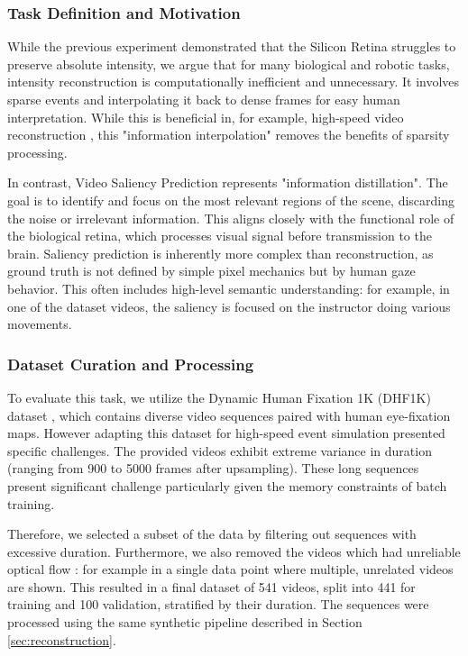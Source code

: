 \documentclass{article}
\begin{document}
\subsubsection{Task Definition and Motivation}
While the previous experiment demonstrated that the Silicon Retina struggles to preserve absolute intensity, we argue that for many biological and robotic tasks, intensity reconstruction is computationally inefficient and unnecessary. It involves sparse events and interpolating it back to dense frames for easy human interpretation. While this is beneficial in, for example, high-speed video reconstruction \cite{rebecq_high_2019}, this "information interpolation" removes the benefits of sparsity processing. 

In contrast, Video Saliency Prediction represents "information distillation". The goal is to identify and focus on the most relevant regions of the scene, discarding the noise or irrelevant information. This aligns closely with the functional role of the biological retina, which processes visual signal before transmission to the brain. Saliency prediction is inherently more complex than reconstruction, as ground truth is not defined by simple pixel mechanics but by human gaze behavior. This often includes high-level semantic understanding: for example, in one of the dataset videos, the saliency is focused on the instructor doing various movements. 

\subsubsection{Dataset Curation and Processing}
To evaluate this task, we utilize the Dynamic Human Fixation 1K (DHF1K) dataset \cite{wang_revisiting_2021}, which contains diverse video sequences paired with human eye-fixation maps. However adapting this dataset for high-speed event simulation presented specific challenges. The provided videos exhibit extreme variance in duration (ranging from 900 to 5000 frames after upsampling). These long sequences present significant challenge particularly given the memory constraints of batch training.

Therefore, we selected a subset of the data by filtering out sequences with excessive duration. Furthermore, we also removed the videos which had unreliable optical flow : for example in a single data point where multiple, unrelated videos are shown. This resulted in a final dataset of 541 videos, split into 441 for training and 100 validation, stratified by their duration. The sequences were processed using the same synthetic pipeline described in Section \ref{sec:reconstruction}.
\end{document}

